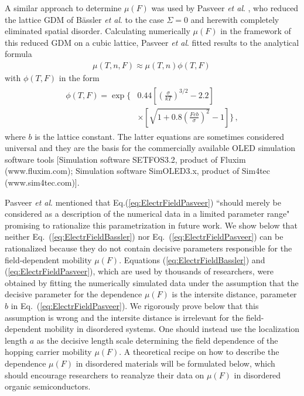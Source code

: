 \documentclass[aps,reprint,amsmath,amssymb,superscriptaddress,showpacs,prb]{revtex4-1}
\begin{document}
A similar approach to determine $\mu(F)$ was used by Pasveer \textit{et al}. \cite{Pasveer2005}, who reduced the lattice GDM of B\"{a}ssler \textit{et al}. to the case $\Sigma = 0$ and herewith completely eliminated spatial disorder. Calculating numerically $\mu(F)$  in the framework of this reduced GDM on a cubic lattice, Pasveer \textit{et al}. fitted results to the analytical formula
\begin{align}
	\label{eq:ElectrFieldPasveer_1}
	\mu(T,n,F)\approx\mu(T,n) \phi(T,F) \,
\end{align}
with $\phi(T,F)$ in the form
\begin{align}
	\label{eq:ElectrFieldPasveer}
	\begin{split}
	\phi(T,F) = \exp\Bigg\{
	  & 0.44 \left[\left(\frac{\sigma}{kT}\right)^{3/2}-2.2\right]            \\
	  & \times \left[\sqrt{1+0.8\left(\frac{Feb}{\sigma}\right)^{2}}-1\right]
	\Bigg\} \, ,
	\end{split}
\end{align}
where $b$ is the lattice constant. The latter equations are sometimes considered universal and they are the basis \cite{Coehoorn_Bobbert_Feature2012} for the commercially
available OLED simulation software tools [Simulation
software SETFOS3.2, product of Fluxim (www.fluxim.com);
Simulation software SimOLED3.x, product of Sim4tec
(www.sim4tec.com)].

Pasveer \textit{et al}. \cite{Pasveer2005} mentioned that Eq.(\ref{eq:ElectrFieldPasveer})  ``should merely be considered as a description of the numerical data in a limited parameter range" promising to rationalize this parametrization in future work. We show below that neither Eq.~(\ref{eq:ElectrFieldBassler}) nor Eq.~(\ref{eq:ElectrFieldPasveer}) can be rationalized because they do not contain decisive parameters responsible for the field-dependent mobility $\mu(F)$. Equations (\ref{eq:ElectrFieldBassler}) and (\ref{eq:ElectrFieldPasveer}), which are used by thousands of researchers, were obtained by fitting the numerically simulated data under the assumption that the decisive parameter for the dependence $\mu(F)$ is the intersite distance, parameter $b$ in Eq.~(\ref{eq:ElectrFieldPasveer}). We rigorously prove below that this assumption is wrong and the intersite distance is irrelevant for the field-dependent mobility in disordered systems. One should instead use the localization length $a$ as the decisive length scale determining the field dependence of the hopping carrier mobility  $\mu(F)$. A theoretical recipe on how to describe the dependence $\mu(F)$ in disordered materials will be formulated below, which should encourage researchers to reanalyze their data on $\mu(F)$ in disordered organic semiconductors.
\end{document}
